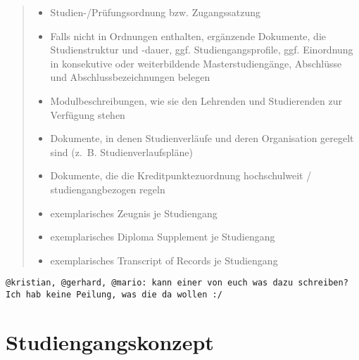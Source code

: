 \begin{quote}
\begin{itemize}
\item
  Studien-/Prüfungsordnung bzw. Zugangssatzung
\item
  Falls nicht in Ordnungen enthalten, ergänzende Dokumente, die
  Studienstruktur und -dauer, ggf. Studiengangsprofile, ggf. Einordnung
  in konsekutive oder weiterbildende Masterstudiengänge, Abschlüsse und
  Abschlussbezeichnungen belegen
\item
  Modulbeschreibungen, wie sie den Lehrenden und Studierenden zur
  Verfügung stehen
\item
  Dokumente, in denen Studienverläufe und deren Organisation geregelt
  sind (z.~B. Studienverlaufspläne)
\item
  Dokumente, die die Kreditpunktezuordnung hochschulweit /
  studiengangbezogen regeln
\item
  exemplarisches Zeugnis je Studiengang
\item
  exemplarisches Diploma Supplement je Studiengang
\item
  exemplarisches Transcript of Records je Studiengang
\end{itemize}
\end{quote}

\begin{verbatim}
@kristian, @gerhard, @mario: kann einer von euch was dazu schreiben? Ich hab keine Peilung, was die da wollen :/
\end{verbatim}

\chapter{Studiengangskonzept}\label{studiengangskonzept}

